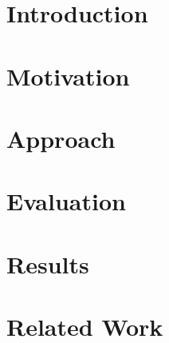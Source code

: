 \documentclass[sigconf, review]{acmart}
\begin{document}
	
	\keywords{}
	
	
	\maketitle
	

	\section{Introduction}
	
	
	\section{Motivation}
	
	
	\section{Approach}
	
	
	\section{Evaluation}
	
	
	\section{Results}
	
	
	\section{Related Work}
	
	
\end{document}
